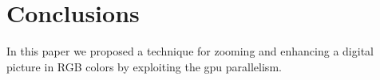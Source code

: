 \section{Conclusions}

In this paper we proposed a technique for zooming and enhancing a digital picture in RGB colors by exploiting the gpu parallelism.  




